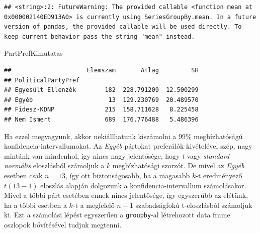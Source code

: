 \documentclass[
]{book}
\newenvironment{Shaded}{\begin{snugshade}}{\end{snugshade}}
\newcommand{\NormalTok}[1]{#1}
\begin{document}
\begin{verbatim}
## <string>:2: FutureWarning: The provided callable <function mean at 0x000002140ED913A0> is currently using SeriesGroupBy.mean. In a future version of pandas, the provided callable will be used directly. To keep current behavior pass the string "mean" instead.
\end{verbatim}

\begin{Shaded}
\begin{Highlighting}[]
\NormalTok{PartPrefKimutatas}
\end{Highlighting}
\end{Shaded}

\begin{verbatim}
##                     Elemszam       Atlag         SH
## PoliticalPartyPref                                 
## Egyesült Ellenzék        182  228.791209  12.500299
## Egyéb                     13  129.230769  20.489570
## Fidesz-KDNP              215  158.711628   8.225458
## Nem Ismert               689  176.776488   5.486396
\end{verbatim}

Ha ezzel megvagyunk, akkor nekiállhatunk kiszámolni a \(99\%\) megbízhatóságú konfidencia-intervallumokat. Az \emph{Egyéb} pártokat preferálók kivételével szép, nagy mintánk van mindenhol, így nincs nagy jelentősége, hogy \emph{t} vagy \emph{standard normális} eloszlásból számoljuk a \(k\) megbízhatósági szorzót. De mivel az \emph{Egyéb} esetben csak \(n=13\), így ott biztonságosabb, ha a magasabb \(k\)-t eredményező \(t(13-1)\) eloszlás alapján dolgozunk a konfidencia-intervallum számolásakor. Mivel a többi párt esetében ennek nincs jelentősége, így egyszerűbb az elétünk, ha a többi esetben a \(k\)-t a megfelelő \(n-1\) szabadságfokú t-eloszlásból számoljuk ki. Ezt a számolási lépést egyszerűen a \texttt{groupby}-al létrehozott data frame oszlopok bővítésével tudjuk megtenni.
\end{document}

